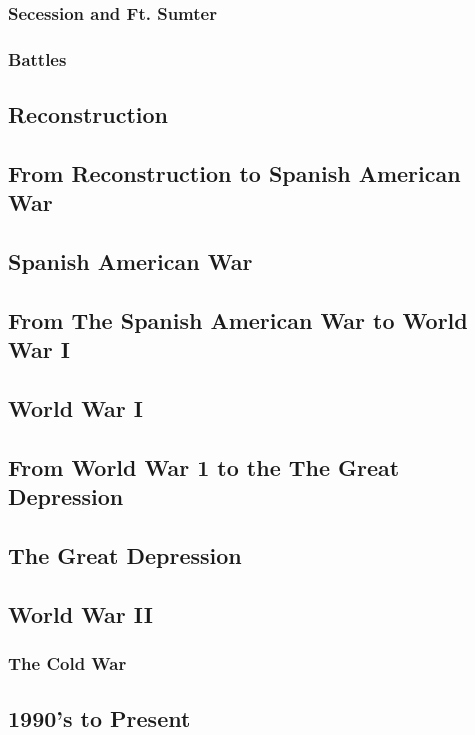 			\subsubsection{Secession and Ft. Sumter}
			\subsubsection{Battles}
			
		\subsection{Reconstruction}
		\subsection{From Reconstruction to Spanish American War}
		\subsection{Spanish American War}
		\subsection{From The Spanish American War to World War I}
		\subsection {World War I}
		\subsection{From World War 1 to the The Great Depression}
		\subsection{The Great Depression}
		\subsection{World War II}
		\subsubsection{The Cold War}
		\subsection{1990's to Present}
		
		
		
		
			
			
	
